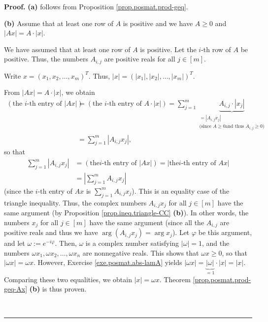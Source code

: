 \documentclass[numbers=enddot,12pt,final,onecolumn,notitlepage]{scrartcl}%
\numberwithin{exer}{subsection}
\theoremstyle{definition}
\newenvironment{proof}[1][Proof]{\noindent\textbf{#1.} }{\ \rule{0.5em}{0.5em}}
\let\sumnonlimits\sum
\renewcommand{\sum}{\sumnonlimits\limits}
\begin{document}
\begin{proof}
\textbf{(a)} follows from Proposition \ref{prop.posmat.prod-geq}. \medskip

\textbf{(b)} Assume that at least one row of $A$ is positive and we have
$A\geq0$ and $\left\vert Ax\right\vert =A\cdot\left\vert x\right\vert $.

We have assumed that at least one row of $A$ is positive. Let the $i$-th row
of $A$ be positive. Thus, the numbers $A_{i,j}$ are positive reals for all
$j\in\left[  m\right]  $.

Write $x=\left(  x_{1},x_{2},\ldots,x_{m}\right)  ^{T}$. Thus, $\left\vert
x\right\vert =\left(  \left\vert x_{1}\right\vert ,\left\vert x_{2}\right\vert
,\ldots,\left\vert x_{m}\right\vert \right)  ^{T}$.

From $\left\vert Ax\right\vert =A\cdot\left\vert x\right\vert $, we obtain%
\begin{align*}
\left(  \text{the }i\text{-th entry of }\left\vert Ax\right\vert \right)    &
=\left(  \text{the }i\text{-th entry of }A\cdot\left\vert x\right\vert
\right)  =\sum_{j=1}^{m}\underbrace{A_{i,j}\cdot\left\vert x_{j}\right\vert
}_{\substack{=\left\vert A_{i,j}x_{j}\right\vert \\\text{(since }A\geq0\text{
and thus }A_{i,j}\geq0\text{)}}}\\
& =\sum_{j=1}^{m}\left\vert A_{i,j}x_{j}\right\vert ,
\end{align*}
so that
\begin{align*}
\sum_{j=1}^{m}\left\vert A_{i,j}x_{j}\right\vert  &  =\left(  \text{the
}i\text{-th entry of }\left\vert Ax\right\vert \right)  =\left\vert \text{the
}i\text{-th entry of }Ax\right\vert \\
&  =\left\vert \sum_{j=1}^{m}A_{i,j}x_{j}\right\vert
\end{align*}
(since the $i$-th entry of $Ax$ is $\sum_{j=1}^{m}A_{i,j}x_{j}$). This is an
equality case of the triangle inequality. Thus, the complex numbers
$A_{i,j}x_{j}$ for all $j\in\left[  m\right]  $ have the same argument (by
Proposition \ref{prop.ineq.triangle-CC} \textbf{(b)}). In other words, the
numbers $x_{j}$ for all $j\in\left[  m\right]  $ have the same argument (since
all the $A_{i,j}$ are positive reals and thus we have $\arg\left(
A_{i,j}x_{j}\right)  =\arg x_{j}$). Let $\varphi$ be this argument, and let
$\omega:=e^{-i\varphi}$. Then, $\omega$ is a complex number satisfying
$\left\vert \omega\right\vert =1$, and the numbers $\omega x_{1},\omega
x_{2},\ldots,\omega x_{n}$ are nonnegative reals. This shows that $\omega
x\geq0$, so that $\left\vert \omega x\right\vert =\omega x$. However, Exercise
\ref{exe.posmat.abs-lamA} yields $\left\vert \omega x\right\vert
=\underbrace{\left\vert \omega\right\vert }_{=1}\cdot\left\vert x\right\vert
=\left\vert x\right\vert $. Comparing these two equalities, we obtain
$\left\vert x\right\vert =\omega x$. Theorem \ref{prop.posmat.prod-geq-Ax}
\textbf{(b)} is thus proven. \medskip


\end{proof}
\end{document}
